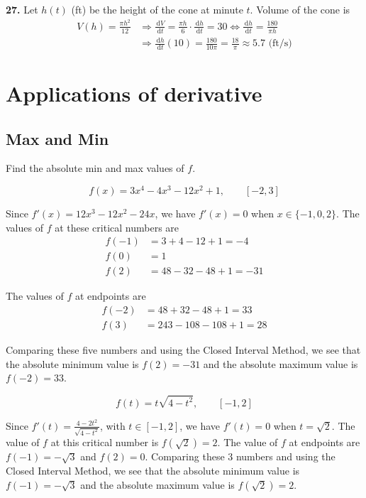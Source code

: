 \documentclass[a4paper,12pt]{article}
\newcommand{\ud}{\,\mathrm{d}}
\begin{document}
\noindent\textbf{27. }Let $h(t)$ (ft) be the height of the cone at minute $t$.
Volume of the cone is
\begin{align*}
  V(h) = \frac{\pi h^2}{12}
  &\Longrightarrow\frac{\ud V}{\ud t} = \frac{\pi h}{6}\cdot\frac{\ud h}{\ud t}
                                      = 30
  \iff\frac{\ud h}{\ud t} = \frac{180}{\pi h}\\
  &\Longrightarrow\frac{\ud h}{\ud t}(10) = \frac{180}{10\pi} = \frac{18}{\pi}
  \approx 5.7\text{ (ft/s)}
\end{align*}

\section{Applications of derivative}
\subsection{Max and Min}
Find the absolute min and max values of $f$.

\[f(x) = 3x^4 - 4x^3 - 12x^2 + 1, \qquad [-2, 3]\tag{51}\]

Since $f'(x) = 12x^3 - 12x^2 - 24x$, we have $f'(x) = 0$ when
$x \in \{-1, 0, 2\}$. The values of $f$ at these critical numbers are
\begin{align*}
  f(-1) &= 3 + 4 - 12 + 1 = -4\\
  f(0)  &= 1\\
  f(2)  &= 48 - 32 - 48 + 1 = -31
\end{align*}

The values of $f$ at endpoints are
\begin{align*}
  f(-2) &= 48 + 32 - 48 + 1 = 33\\
  f(3)  &= 243 - 108 - 108 + 1 = 28
\end{align*}

Comparing these five numbers and using the Closed Interval Method, we see that
the absolute minimum value is $f(2) = -31$ and the absolute maximum value is
$f(-2) = 33$.

\[f(t) = t\sqrt{4 - t^2}, \qquad [-1, 2]\tag{55}\]

Since $f'(t) = \frac{4 - 2t^2}{\sqrt{4 - t^2}}$, with $t \in [-1, 2]$, we have
$f'(t) = 0$ when $t = \sqrt{2}$. The value of $f$ at this critical number is
$f(\sqrt{2}) = 2$. The value of $f$ at endpoints are $f(-1) = -\sqrt{3}$ and
$f(2) = 0$. Comparing these 3 numbers and using the Closed Interval Method, we
see that the absolute minimum value is $f(-1) = -\sqrt{3}$ and the absolute
maximum value is $f(\sqrt{2}) = 2$.
\end{document}
